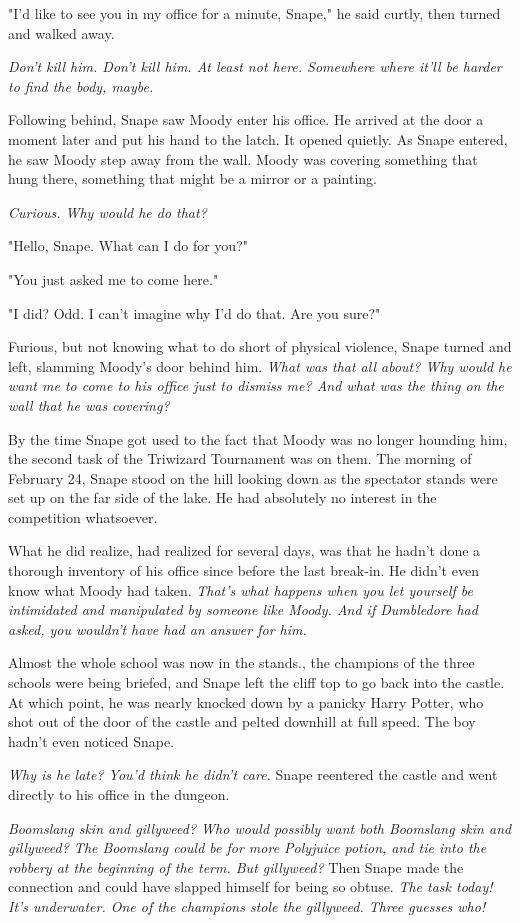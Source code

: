 "I'd like to see you in my office for a minute, Snape," he said curtly, then turned and walked away.

\emph{Don't kill him. Don't kill him. At least not here. Somewhere where it'll be harder to find the body, maybe.}

Following behind, Snape saw Moody enter his office. He arrived at the door a moment later and put his hand to the latch. It opened quietly. As Snape entered, he saw Moody step away from the wall. Moody was covering something that hung there, something that might be a mirror or a painting.

\emph{Curious. Why would he do that?}

"Hello, Snape. What can I do for you?"

"You just asked me to come here."

"I did? Odd. I can't imagine why I'd do that. Are you sure?"

Furious, but not knowing what to do short of physical violence, Snape turned and left, slamming Moody's door behind him. \emph{What was that all about? Why would he want me to come to his office just to dismiss me? And what was the thing on the wall that he was covering?}

By the time Snape got used to the fact that Moody was no longer hounding him, the second task of the Triwizard Tournament was on them. The morning of February 24, Snape stood on the hill looking down as the spectator stands were set up on the far side of the lake. He had absolutely no interest in the competition whatsoever.

What he did realize, had realized for several days, was that he hadn't done a thorough inventory of his office since before the last break-in. He didn't even know what Moody had taken. \emph{That's what happens when you let yourself be intimidated and manipulated by someone like Moody. And if Dumbledore had asked, you wouldn't have had an answer for him.}

Almost the whole school was now in the stands., the champions of the three schools were being briefed, and Snape left the cliff top to go back into the castle. At which point, he was nearly knocked down by a panicky Harry Potter, who shot out of the door of the castle and pelted downhill at full speed. The boy hadn't even noticed Snape.

\emph{Why is he late? You'd think he didn't care.} Snape reentered the castle and went directly to his office in the dungeon.

\emph{Boomslang skin and gillyweed? Who would possibly want both Boomslang skin and gillyweed? The Boomslang could be for more Polyjuice potion, and tie into the robbery at the beginning of the term. But gillyweed?} Then Snape made the connection and could have slapped himself for being so obtuse. \emph{The task today! It's underwater. One of the champions stole the gillyweed. Three guesses who!}


